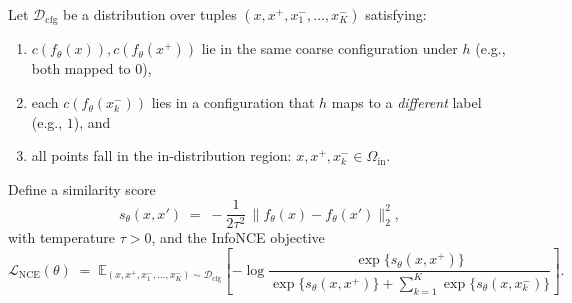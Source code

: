 \documentclass[11pt]{article}
\newcommand{\E}{\mathbb{E}}
\theoremstyle{remark}
\theoremstyle{plain}
\begin{document}
Let $\mathcal{D}_{\mathrm{cfg}}$ be a distribution over tuples
$(x, x^+, x^-_1,\dots,x^-_K)$ satisfying:
\begin{enumerate}[label=(A\arabic*),leftmargin=*]
  \item $c(f_\theta(x)), c(f_\theta(x^+))$ lie in the same coarse configuration under $h$
    (e.g., both mapped to $0$),
  \item each $c(f_\theta(x^-_k))$ lies in a configuration that $h$ maps to a \emph{different} label
    (e.g., $1$), and
  \item all points fall in the in-distribution region: $x,x^+,x^-_k \in \Omega_{\mathrm{in}}$.
\end{enumerate}
Define a similarity score
\[
s_\theta(x,x') \;=\; -\frac{1}{2\tau^2}\,
\bigl\| f_\theta(x) - f_\theta(x') \bigr\|_2^2,
\]
with temperature $\tau>0$, and the InfoNCE objective
\begin{equation}
\label{eq:existence-nce}
\mathcal{L}_{\mathrm{NCE}}(\theta)
\;=\;
\E_{(x,x^+,x^-_1,\dots,x^-_K) \sim \mathcal{D}_{\mathrm{cfg}}}
\left[
  -\log \frac{\exp\{s_\theta(x,x^+)\}}{
  \exp\{s_\theta(x,x^+)\} + \sum_{k=1}^K \exp\{s_\theta(x,x^-_k)\}}
\right].
\end{equation}
\end{document}

